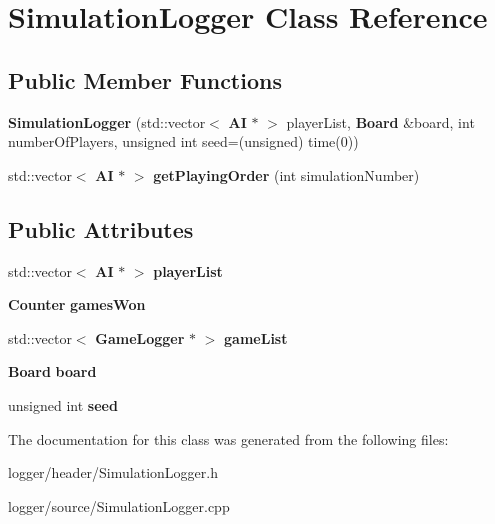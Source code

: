 \section{Simulation\-Logger Class Reference}
\label{class_simulation_logger}
\subsection*{Public Member Functions}
\begin{DoxyCompactItemize}
\item 
{\bfseries Simulation\-Logger} (std\-::vector$<$ {\bf A\-I} $\ast$ $>$ player\-List, {\bf Board} \&board, int number\-Of\-Players, unsigned int seed=(unsigned) time(0))\label{class_simulation_logger_a37a43872a7fbee07130e3b39460b54c6}

\item 
std\-::vector$<$ {\bf A\-I} $\ast$ $>$ {\bfseries get\-Playing\-Order} (int simulation\-Number)\label{class_simulation_logger_a4ff55e48a33b19bbd8108d33c9ccf2bf}

\end{DoxyCompactItemize}
\subsection*{Public Attributes}
\begin{DoxyCompactItemize}
\item 
std\-::vector$<$ {\bf A\-I} $\ast$ $>$ {\bfseries player\-List}\label{class_simulation_logger_a344898f3a4cd7df47e8e7dafd0ff5bd6}

\item 
{\bf Counter} {\bfseries games\-Won}\label{class_simulation_logger_ab3ee79eb79f0c07d42ebebebf057587b}

\item 
std\-::vector$<$ {\bf Game\-Logger} $\ast$ $>$ {\bfseries game\-List}\label{class_simulation_logger_abe55e6d0fb8933d3f7f289a1f255f1ad}

\item 
{\bf Board} {\bfseries board}\label{class_simulation_logger_a224021a57c2a155d5bec0548d6368fe1}

\item 
unsigned int {\bfseries seed}\label{class_simulation_logger_a9af9361d2d81c2e0fd47a5fb26285761}

\end{DoxyCompactItemize}


The documentation for this class was generated from the following files\-:\begin{DoxyCompactItemize}
\item 
logger/header/Simulation\-Logger.\-h\item 
logger/source/Simulation\-Logger.\-cpp\end{DoxyCompactItemize}
